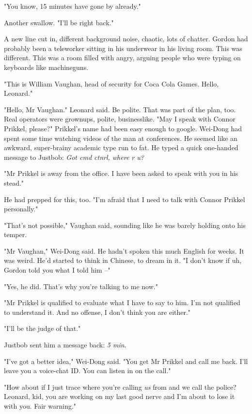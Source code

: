 "You know, 15 minutes have gone by already."

Another swallow. "I'll be right back."

A new line cut in, different background noise, chaotic, lots of
chatter. Gordon had probably been a teleworker sitting in his
underwear in his living room. This was different. This was a room
filled with angry, arguing people who were typing on keyboards like
machineguns.

"This is William Vaughan, head of security for Coca Cola Games.
Hello, Leonard."

"Hello, Mr Vaughan." Leonard said. Be polite. That was part of the
plan, too. Real operators were grownups, polite, businesslike. "May
I speak with Connor Prikkel, please?" Prikkel's name had been easy
enough to google. Wei-Dong had spent some time watching videos of
the man at conferences. He seemed like an awkward, super-brainy
academic type run to fat. He typed a quick one-handed message to
Justbob: \emph{Got cmd ctnrl, where r u?}

"Mr Prikkel is away from the office. I have been asked to speak
with you in his stead."

He had prepped for this, too. "I'm afraid that I need to talk with
Connor Prikkel personally."

"That's not possible," Vaughan said, sounding like he was barely
holding onto his temper.

"Mr Vaughan," Wei-Dong said. He hadn't spoken this much English for
weeks. It was weird. He'd started to think in Chinese, to dream in
it. "I don't know if uh, Gordon told you what I told him --"

"Yes, he did. That's why you're talking to me now."

"Mr Prikkel is qualified to evaluate what I have to say to him. I'm
not qualified to understand it. And no offense, I don't think you
are either."

"I'll be the judge of that."

Justbob sent him a message back: \emph{5 min}.

"I've got a better idea," Wei-Dong said. "You get Mr Prikkel and
call me back. I'll leave you a voice-chat ID. You can listen in on
the call."

"How about if I just trace where you're calling \emph{us} from and
we call the police? Leonard, kid, you are working on my last good
nerve and I'm about to lose it with you. Fair warning."

